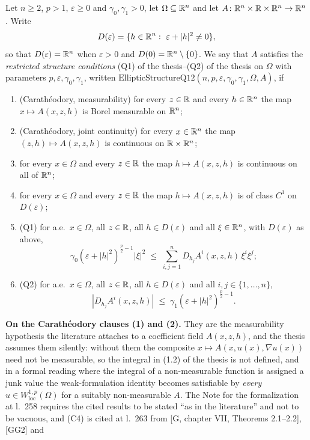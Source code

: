 \begin{definition}
Let $n\ge 2$, $p>1$, $\varepsilon\ge0$ and $\gamma_0,\gamma_1>0$, let
$\Omega\subseteq\mathbb{R}^n$ and let
$A\colon\mathbb{R}^n\times\mathbb{R}\times\mathbb{R}^n\to\mathbb{R}^n$.  Write
\[
D(\varepsilon)=\{h\in\R^n:\ \varepsilon+|h|^2\ne0\},
\]
so that $D(\varepsilon)=\mathbb{R}^n$ when $\varepsilon>0$ and
$D(0)=\mathbb{R}^n\setminus\{0\}$.  We say that $A$ satisfies the \emph{restricted
structure conditions} (Q1) of the thesis--(Q2) of the thesis on $\Omega$ with parameters
$p,\varepsilon,\gamma_0,\gamma_1$, written
$\mathrm{EllipticStructureQ12}(n,p,\varepsilon,\gamma_0,\gamma_1,\Omega,A)$, if
\begin{enumerate}
\item (Carath\'eodory, measurability) for every $z\in\mathbb{R}$ and every $h\in\mathbb{R}^n$ the
  map $x\mapsto A(x,z,h)$ is Borel measurable on $\mathbb{R}^n$;
\item (Carath\'eodory, joint continuity) for every $x\in\mathbb{R}^n$ the map
  $(z,h)\mapsto A(x,z,h)$ is continuous on $\mathbb{R}\times\mathbb{R}^n$;
\item for every $x\in\Omega$ and every $z\in\mathbb{R}$ the map $h\mapsto A(x,z,h)$ is
  continuous on all of $\mathbb{R}^n$;
\item for every $x\in\Omega$ and every $z\in\mathbb{R}$ the map $h\mapsto A(x,z,h)$ is
  of class $C^1$ on $D(\varepsilon)$;
\item (Q1) for a.e.\ $x\in\Omega$, all $z\in\mathbb{R}$, all $h\in D(\varepsilon)$ and
  all $\xi\in\mathbb{R}^n$, with $D(\varepsilon)$ as above,
\[
\gamma_0(\varepsilon+|h|^2)^{\frac p2-1}|\xi|^2
\;\le\;\sum_{i,j=1}^n D_{h_j}A^i(x,z,h)\,\xi^i\xi^j ;
\]
\item (Q2) for a.e.\ $x\in\Omega$, all $z\in\mathbb{R}$, all $h\in D(\varepsilon)$ and
  all $i,j\in\{1,\dots,n\}$,
\[
|D_{h_j}A^i(x,z,h)|\;\le\;\gamma_1(\varepsilon+|h|^2)^{\frac p2-1}.
\]
\end{enumerate}
\noindent\textbf{On the Carath\'eodory clauses (1) and (2).}  They are the
measurability hypothesis the literature attaches to a coefficient field
$A(x,z,h)$, and the thesis assumes them silently: without them the composite
$x\mapsto A(x,u(x),\nabla u(x))$ need not be measurable, so the integral in
(1.2) of the thesis is not defined, and in a formal reading where the integral of a
non-measurable function is assigned a junk value the weak-formulation identity
becomes satisfiable by \emph{every} $u\in W^{1,p}_{\mathrm{loc}}(\Omega)$ for a
suitably non-measurable $A$.  The Note for the formalization at l.~258 requires
the cited results to be stated ``as in the literature'' and not to be vacuous,
and (C4) is cited at l.~263 from [G, chapter VII, Theorems 2.1--2.2], [GG2] and

\end{definition}
